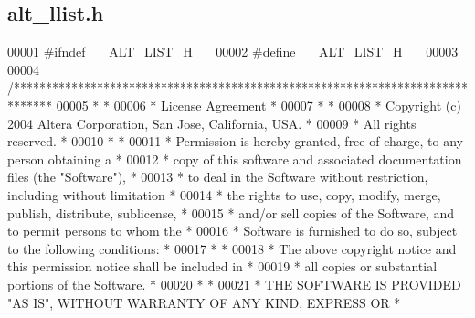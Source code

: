 \subsection{alt\+\_\+llist.\+h}
\label{alt__llist_8h_source}

\begin{DoxyCode}
00001 \textcolor{preprocessor}{#ifndef \_\_ALT\_LIST\_H\_\_}
00002 \textcolor{preprocessor}{#define \_\_ALT\_LIST\_H\_\_}
00003 
00004 \textcolor{comment}{/******************************************************************************}
00005 \textcolor{comment}{*                                                                             *}
00006 \textcolor{comment}{* License Agreement                                                           *}
00007 \textcolor{comment}{*                                                                             *}
00008 \textcolor{comment}{* Copyright (c) 2004 Altera Corporation, San Jose, California, USA.           *}
00009 \textcolor{comment}{* All rights reserved.                                                        *}
00010 \textcolor{comment}{*                                                                             *}
00011 \textcolor{comment}{* Permission is hereby granted, free of charge, to any person obtaining a     *}
00012 \textcolor{comment}{* copy of this software and associated documentation files (the "Software"),  *}
00013 \textcolor{comment}{* to deal in the Software without restriction, including without limitation   *}
00014 \textcolor{comment}{* the rights to use, copy, modify, merge, publish, distribute, sublicense,    *}
00015 \textcolor{comment}{* and/or sell copies of the Software, and to permit persons to whom the       *}
00016 \textcolor{comment}{* Software is furnished to do so, subject to the following conditions:        *}
00017 \textcolor{comment}{*                                                                             *}
00018 \textcolor{comment}{* The above copyright notice and this permission notice shall be included in  *}
00019 \textcolor{comment}{* all copies or substantial portions of the Software.                         *}
00020 \textcolor{comment}{*                                                                             *}
00021 \textcolor{comment}{* THE SOFTWARE IS PROVIDED "AS IS", WITHOUT WARRANTY OF ANY KIND, EXPRESS OR  *}

\end{DoxyCode}
